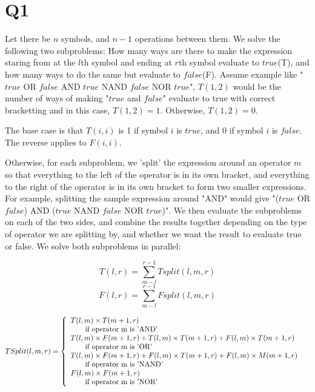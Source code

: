 \documentclass[a4paper]{article}
\begin{document}
	\section*{Q1}
 	Let there be $n$ symbols, and $n-1$ operations between them. We solve the following two subproblems: How many ways are there to make the expression staring from at the $l$th symbol and ending at $r$th symbol evaluate to $true$(T), and how many ways to do the same but evaluate to $false$(F). Assume example like "$true$ OR $false$ AND $true$ NAND $false$ NOR $true$", $T(1,2)$ would be the number of ways of making "$true$ and $false$" evaluate to true with correct bracketting and in this case, $T(1,2) = 1$. Otherwise, $T(1,2) = 0$.
 	
 	The base case is that $T(i,i)$ is 1 if symbol $i$ is $true$, and 0 if symbol $i$ is $false$. The reverse applies to $F(i,i)$.
 	
 	Otherwise, for each subproblem, we 'split' the expression around an operator $m$ so that everything to the left of the operator is in its own bracket, and everything to the right of the operator is in its own bracket to form two smaller expressions. For example, splitting the sample expression around "AND" would give "($true$ OR $false$) AND ($true$ NAND $false$ NOR $true$)". We then evaluate the subproblems on each of the two sides, and combine the results together depending on the type of operator we are splitting by, and whether we want the result to evaluate true or false. We solve both subproblems in parallel:
 	
 	\[T(l,r)=\sum_{m-l}^{r-1}Tsplit(l,m,r) \] 
 	\[F(l,r)=\sum_{m-l}^{r-1}Fsplit(l,m,r) \] 
 	
	$$TSplit(l,m,r)=\left\{
	\begin{array}{lcr}
		T(l,m)\times T(m+1,r)&\\
		\mbox{\quad\quad if operator m is 'AND'}&\\
		T(l,m)\times F(m+1,r) + T(l,m)\times T(m+1,r) + F(l,m)\times T(m+1,r)\\
		\mbox{\quad\quad if operator m is 'OR'}\\
		T(l,m)\times F(m+1,r) + F(l,m)\times T(m+1,r) + F(l,m)\times M(m+1,r)\\
		\mbox{\quad\quad if operator m is 'NAND'}\\
		F(l,m)\times F(m+1,r)\\
		\mbox{\quad\quad if operator m is 'NOR'}
	\end{array}
	\right.
	$$
	
\end{document}
